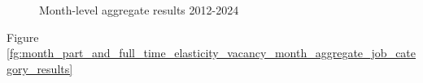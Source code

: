 \documentclass[12pt]{article}
\begin{document}
\begin{figure}[!ht]
\begin{center}
  \caption{Month-level aggregate results 2012-2024}
  \label{fg:month_part_and_full_time_elasticity_unemployed_month_aggregate_job_category_results} 
  \end{center}
  \footnotesize
\end{figure} 

Figure \ref{fg:month_part_and_full_time_elasticity_vacancy_month_aggregate_job_category_results}
\end{document}
